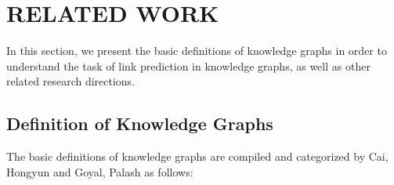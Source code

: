 \section{RELATED WORK}
\label{chap:RelatedWork}

In this section, we present the basic definitions of knowledge graphs in order to understand the task of link prediction in knowledge graphs, as well as other related research directions.

\subsection{Definition of Knowledge Graphs}

The basic definitions of knowledge graphs are compiled and categorized by Cai, Hongyun \cite{cai2018comprehensive} and Goyal, Palash \cite{goyal2018graph} as follows:



